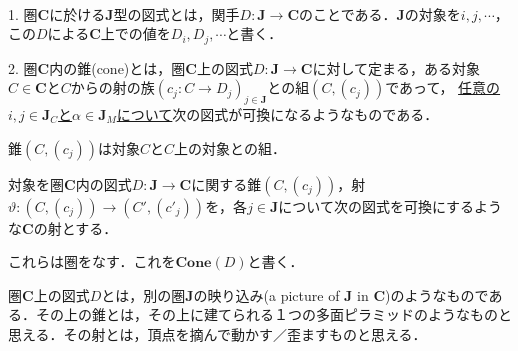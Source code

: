 \documentclass[uplatex, 12pt, dvipdfmx]{jsarticle}
\begin{document}
\begin{definition}[図式，錐]　

    1. 圏$\mathbf{C}$に於ける$\mathbf{J}$型の図式とは，関手$D:\mathbf{J}\to \mathbf{C}$のことである．$\mathbf{J}$の対象を$i,j,\cdots$，この$D$による$\mathbf{C}$上での値を$D_i,D_j,\cdots$と書く．

    2. 圏$\mathbf{C}$内の錐(cone)とは，圏$\mathbf{C}$上の図式$D:\mathbf{J}\to\mathbf{C}$に対して定まる，ある対象$C\in\mathbf{C}$と$C$からの射の族$(c_j:C\to D_j)_{j\in\mathbf{J}}$との組$(C,(c_j))$であって，
    \underline{任意の$i,j\in\mathbf{J}_C$と$\alpha\in\mathbf{J}_M$について}次の図式が可換になるようなものである．
    \begin{center}
    \end{center}
\end{definition}
\begin{remark*}
    錐$(C,(c_j))$は対象$C$と$C$上の対象との組．
\end{remark*}
\begin{proposition*}[錐全体の圏]
    対象を圏$\mathbf{C}$内の図式$D:\mathbf{J}\to\mathbf{C}$に関する錐$(C,(c_j))$，射$\vartheta:(C,(c_j))\to (C',(c'_j))$を，各$j\in\mathbf{J}$について次の図式を可換にするような$\mathbf{C}$の射とする．
    \begin{center}
    \end{center}
    これらは圏をなす．これを$\mathbf{Cone}(D)$と書く．
\end{proposition*}
\begin{remark*}[錐のイメージ]
    圏$\mathbf{C}$上の図式$D$とは，別の圏$\mathbf{J}$の映り込み(a picture of $\mathbf{J}$ in $\mathbf{C}$)のようなものである．その上の錐とは，その上に建てられる１つの多面ピラミッドのようなものと思える．その射とは，頂点を摘んで動かす／歪ますものと思える．
\end{remark*}
\end{document}
